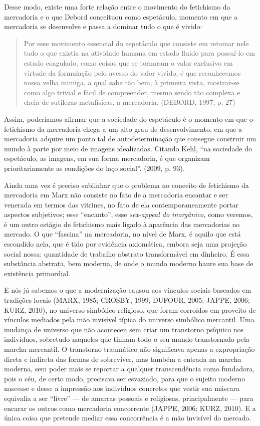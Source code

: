 Desse modo, existe uma forte relação entre o movimento do fetichismo da
mercadoria e o que Debord conceituou como espetáculo, momento em que a
mercadoria se desenvolve e passa a dominar tudo o que é vivido:

\begin{quote}
Por esse movimento essencial do espetáculo que consiste em retomar nele
tudo o que existia na atividade humana em estado fluido para possuí-lo
em estado coagulado, como coisas que se tornaram o valor exclusivo em
virtude da formulação pelo avesso do valor vivido, é que reconhecemos
nossa velha inimiga, a qual sabe tão bem, à primeira vista, mostrar-se
como algo trivial e fácil de compreender, mesmo sendo tão complexa e
cheia de sutilezas metafísicas, a mercadoria. (DEBORD, 1997, p. 27)
\end{quote}

Assim, poderíamos afirmar que a sociedade do espetáculo é o momento em
que o fetichismo da mercadoria chega a um alto grau de desenvolvimento,
em que a mercadoria adquire um ponto tal de autodeterminação que
consegue construir um mundo à parte por meio de imagens idealizadas.
Citando Kehl, ``na sociedade do espetáculo, as imagens, em sua forma
mercadoria, é que organizam prioritariamente as condições do laço
social''. (2009, p. 93).

Ainda uma vez é preciso sublinhar que o problema no conceito de
fetichismo da mercadoria em Marx não consiste no fato de a mercadoria
encantar e ser venerada em termos das vitrines, no fato de ela
contemporaneamente portar aspectos subjetivos; esse ``encanto'', esse
\emph{sex}-\emph{appeal do inorgânico,} como veremos, é um outro estágio
de fetichismo mais ligado à aparência das mercadorias no mercado. O que
``fascina'' na mercadoria, no nível de Marx, é aquilo que está escondido
nela, que é tido por evidência axiomática, embora seja uma projeção
social nossa: quantidade de trabalho abstrato transformável em dinheiro.
É essa substância abstrata, bem moderna, de onde o mundo moderno haure
sua base de existência primordial.

E nós já sabemos o que a modernização causou aos vínculos sociais
baseados em tradições locais (MARX, 1985; CROSBY, 1999, DUFOUR, 2005;
JAPPE, 2006; KURZ, 2010), no universo simbólico religioso, que foram
corroídos em proveito de vínculos mediados pela mão invisível típica do
universo simbólico mercantil. Uma mudança de universo que não aconteceu
sem criar um transtorno psíquico nos indivíduos, sobretudo naqueles que
tinham todo o seu mundo transtornado pela marcha mercantil. O transtorno
traumático não significava apenas a expropriação direta e indireta das
formas de sobreviver, mas também a entrada na marcha moderna, sem poder
mais se reportar a qualquer transcendência como fundadora, pois o céu,
de certo modo, precisava ser esvaziado, para que o sujeito moderno
nascesse e desse a impressão aos indivíduos concretos que vestir sua
máscara equivalia a ser ``livre'' --- de amarras pessoais e religiosas,
principalmente --- para encarar os outros como mercadoria concorrente
(JAPPE, 2006; KURZ, 2010). E a única coisa que pretende mediar essa
concorrência é a mão invisível do mercado.

